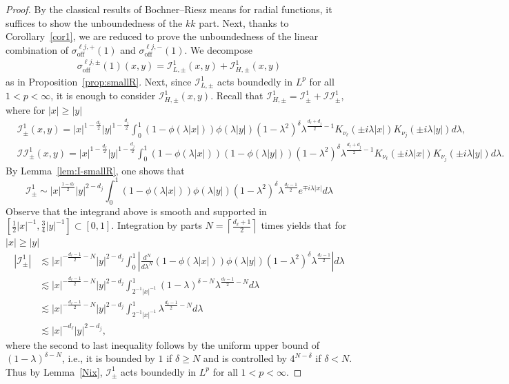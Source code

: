 \documentclass[12pt]{amsart}
\begin{document}
\begin{proof}
By the classical results of Bochner--Riesz means for radial functions, it suffices to show the unboundedness of the \(kk\) part. Next, thanks to Corollary~\ref{cor1}, we are reduced to prove the unboundedness of the linear combination of $\sigma_{\mathrm{off}}^{\ell j, +}(1)$ and $\sigma_{\mathrm{off}}^{\ell j, -}(1)$. We decompose 
\begin{align*}
    \sigma_{\mathrm{off}}^{\ell j, \pm}(1)(x,y) = \mathcal{I}_{L,\pm}^1(x,y)+\mathcal{I}_{H,\pm}^1(x,y) 
\end{align*}
as in Proposition~\ref{prop:smallR}. Next, since $\mathcal{I}_{L,\pm}^1$ acts boundedly in $L^p$ for all $1<p<\infty$, it is enough to consider $\mathcal{I}_{H,\pm}^1(x,y)$. Recall that $\mathcal{I}_{H,\pm}^1 = \mathcal{I}_{\pm}^1 + \mathcal{II}_{\pm}^1$, where for $|x|\ge |y|$
\begin{align*}
&\mathcal{I}_{\pm}^1(x,y) = |x|^{1-\frac{d_\ell}{2}}|y|^{1-\frac{d_j}{2}}
\int_0^1
(1-\phi(\lambda |x|))\phi(\lambda |y|)(1-\lambda^2)^\delta
\lambda^{\frac{d_\ell+d_j}{2}-1}
K_{\nu_\ell}(\pm i\lambda |x|)K_{\nu_j}(\pm i\lambda |y|) d\lambda,\\
&\mathcal{II}_{\pm}^1(x,y)
= |x|^{1-\frac{d_\ell}{2}}|y|^{1-\frac{d_j}{2}}
\int_0^1
(1-\phi(\lambda |x|))(1-\phi(\lambda |y|))(1-\lambda^2)^\delta
\lambda^{\frac{d_\ell+d_j}{2}-1}
K_{\nu_\ell}(\pm i\lambda |x|)K_{\nu_j}(\pm i\lambda |y|) d\lambda.
\end{align*}
By Lemma~\ref{lem:I-smallR}, one shows that
$$
\mathcal{I}_{\pm}^1 \sim |x|^{\frac{1-d_\ell}{2}}|y|^{2-d_j}
\int_0^1
(1-\phi(\lambda |x|))\phi(\lambda |y|)(1-\lambda^2)^\delta
\lambda^{\frac{d_\ell-1}{2}}e^{\mp i\lambda |x|} d\lambda
$$
Observe that the integrand above is smooth and supported in $\left[ \frac{1}{2}|x|^{-1}, \frac{3}{4}|y|^{-1} \right] \subset [0,1]$. Integration by parts $N = \left\lceil \frac{d_\ell+1}{2} \right\rceil$ times yields that for $|x|\ge |y|$
\begin{align*}
    |\mathcal{I}_{\pm}^1| &\lesssim |x|^{-\frac{d_\ell-1}{2}-N}|y|^{2-d_j} \int_0^1 \left| \frac{d^N}{d\lambda^N} (1-\phi(\lambda |x|))\phi(\lambda |y|)(1-\lambda^2)^\delta
\lambda^{\frac{d_\ell-1}{2}}    \right| d\lambda \\
&\lesssim |x|^{-\frac{d_\ell-1}{2}-N}|y|^{2-d_j} \int_{2^{-1}|x|^{-1}}^1 (1-\lambda)^{\delta-N} \lambda^{\frac{d_\ell-1}{2}-N} d\lambda\\
& \lesssim |x|^{-\frac{d_\ell-1}{2}-N}|y|^{2-d_j} \int_{2^{-1}|x|^{-1}}^1 \lambda^{\frac{d_\ell-1}{2}-N} d\lambda\\
&\lesssim |x|^{-d_\ell} |y|^{2-d_j},
\end{align*}
where the second to last inequality follows by the uniform upper bound of $(1-\lambda)^{\delta-N}$, i.e., it is bounded by $1$ if $\delta \ge N$ and is controlled by $4^{N-\delta}$ if $\delta<N$. Thus by Lemma~\ref{Nix}, $\mathcal{I}_{\pm}^1$ acts boundedly in $L^p$ for all $1<p<\infty$.


\end{proof}
\end{document}
